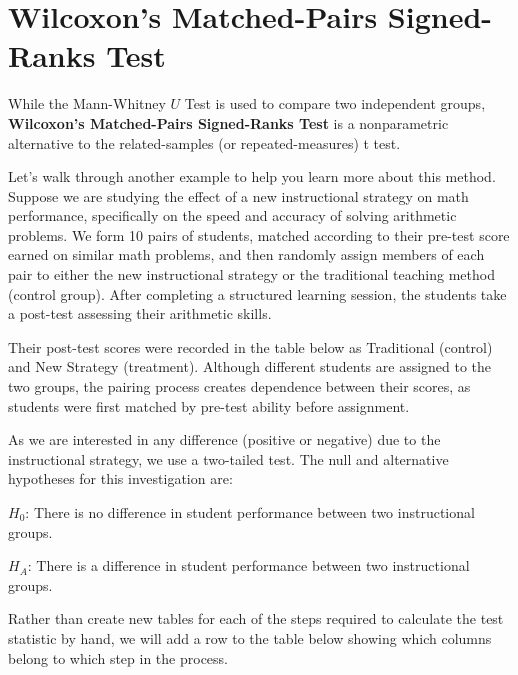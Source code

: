 \documentclass[
  letterpaper,
  DIV=11,
  numbers=noendperiod]{scrreprt}
\begin{document}
\section{Wilcoxon's Matched-Pairs Signed-Ranks
Test}\label{wilcoxons-matched-pairs-signed-ranks-test}

While the Mann-Whitney \(U\) Test is used to compare two independent
groups, \textbf{Wilcoxon's Matched-Pairs Signed-Ranks Test} is a
nonparametric alternative to the related-samples (or repeated-measures)
t test.

Let's walk through another example to help you learn more about this
method. Suppose we are studying the effect of a new instructional
strategy on math performance, specifically on the speed and accuracy of
solving arithmetic problems. We form 10 pairs of students, matched
according to their pre-test score earned on similar math problems, and
then randomly assign members of each pair to either the new
instructional strategy or the traditional teaching method (control
group). After completing a structured learning session, the students
take a post-test assessing their arithmetic skills.

Their post-test scores were recorded in the table below as Traditional
(control) and New Strategy (treatment). Although different students are
assigned to the two groups, the pairing process creates dependence
between their scores, as students were first matched by pre-test ability
before assignment.

As we are interested in any difference (positive or negative) due to the
instructional strategy, we use a two-tailed test. The null and
alternative hypotheses for this investigation are:

\(H_0\): There is no difference in student performance between two
instructional groups.

\(H_A\): There is a difference in student performance between two
instructional groups.

Rather than create new tables for each of the steps required to
calculate the test statistic by hand, we will add a row to the table
below showing which columns belong to which step in the process.
\end{document}

